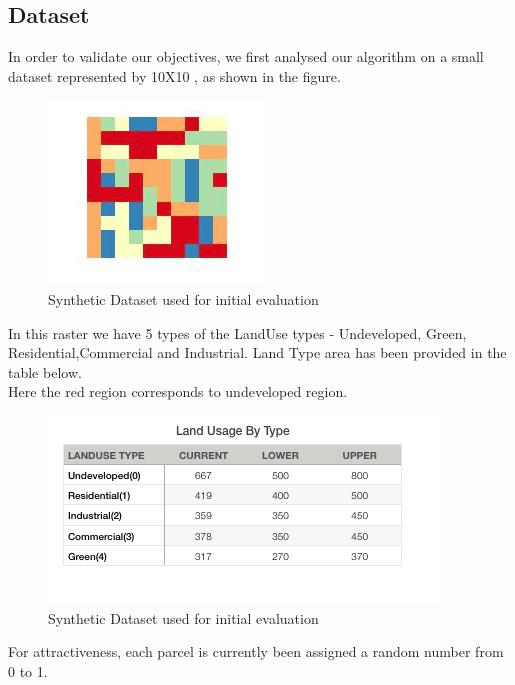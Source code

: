 \documentclass{sig-alternate}
\begin{document}
\subsection{Dataset}
In order to validate our objectives, we first analysed our algorithm on a small dataset represented by 10X10  , as shown in the figure.
\begin{figure}[h]
\begin{center}
\includegraphics[width=3.in]{orig.png}
\caption{Synthetic Dataset used for initial evaluation}
\end{center}
\end{figure}

In this raster we have 5 types of the LandUse types - Undeveloped, Green, Residential,Commercial and Industrial. Land Type area has been provided in the table below.\\
Here the red region corresponds to undeveloped region.\\
\begin{figure}[h]
\begin{center}
\includegraphics[width=4.in]{areas.png}
\caption{Synthetic Dataset used for initial evaluation}
\end{center}
\end{figure}

For attractiveness, each parcel is currently been assigned a random number from 0 to 1. \\
\end{document}
